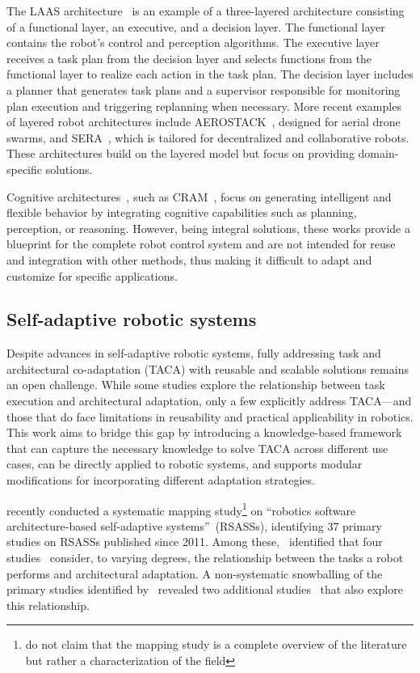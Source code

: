 The LAAS architecture~\mbox{\citep{laas_98}} is an example of a three-layered architecture consisting of a functional layer, an executive, and a decision layer. The functional layer contains the robot's control and perception algorithms. The executive layer receives a task plan from the decision layer and selects functions from the functional layer to realize each action in the task plan. The decision layer includes a planner that generates task plans and a supervisor responsible for monitoring plan execution and triggering replanning when necessary.
More recent examples of layered robot architectures include AEROSTACK~\mbox{\citep{Sanchez-Lopez-2016}}, designed for aerial drone swarms, and SERA~\mbox{\citep{Garcia-2018}}, which is tailored for decentralized and collaborative robots. These architectures build on the layered model but focus on providing domain-specific solutions.

Cognitive architectures~\mbox{\citep{Kotseruba-2018}}, such as CRAM~\mbox{\citep{Beetz-2010, Kazhoyan-2021}}, focus on generating intelligent and flexible behavior by integrating cognitive capabilities such as planning, perception, or reasoning. However, being integral solutions, these works provide a blueprint for the complete robot control system and are not intended for reuse and integration with other methods, thus making it difficult to adapt and customize for specific applications.

\subsection{Self-adaptive robotic systems}\label{sec:related_sars}

Despite advances in self-adaptive robotic systems, fully addressing task and architectural co-adaptation (TACA) with reusable and scalable solutions remains an open challenge. While some studies explore the relationship between task execution and architectural adaptation, only a few explicitly address TACA—and those that do face limitations in reusability and practical applicability in robotics. This work aims to bridge this gap by introducing a knowledge-based framework that can capture the necessary knowledge to solve TACA across different use cases, can be directly applied to robotic systems, and supports modular modifications for incorporating different adaptation strategies.

\mbox{\cite{ALBERTS2025112258}} recently conducted a systematic mapping study\footnote{\mbox{\cite{ALBERTS2025112258}} do not claim that the mapping study is a complete overview of the literature but rather a characterization of the field} on ``robotics software architecture-based self-adaptive systems''~(RSASSs), identifying 37 primary studies on RSASSs published since 2011. Among these,~\cite{ALBERTS2025112258} identified that four studies~\citep{park2012task, runtime_variability_lotz, rra_nico, CAMARASoftwareArchitectureTask2020} consider, to varying degrees, the relationship between the tasks a robot performs and architectural adaptation. A non-systematic snowballing of the primary studies identified by~\cite{ALBERTS2025112258} revealed two additional studies~\citep{braberman2018extended, temoto} that also explore this relationship.

